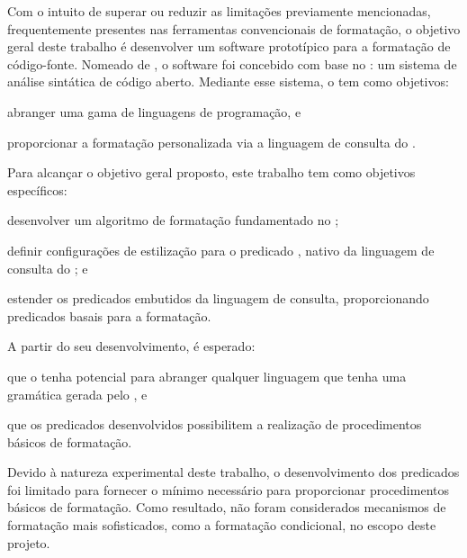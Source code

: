 \documentclass
  [11pt,a4paper,english,brazil,openright,sumario=tradicional,twoside]
  {abntex2}
\begin{document}
  Com o intuito de superar ou reduzir as limitações previamente mencionadas,
  frequentemente presentes nas ferramentas convencionais de formatação, o
  objetivo geral deste trabalho é desenvolver um software prototípico para a
  formatação de código-fonte. Nomeado de \witchcooking \cite{silva-2023-witch},
  o software foi concebido com base no \treesitter
  \cite{tree-sitter-2023-tree}: um sistema de análise sintática de código
  aberto. Mediante esse sistema, o \witchcooking tem como objetivos:
  \begin{inparaenum}
    \item abranger uma gama de linguagens de programação, e
    \item proporcionar a formatação personalizada via a linguagem de consulta
          do \treesitter.
  \end{inparaenum}

  Para alcançar o objetivo geral proposto, este trabalho tem como objetivos
  específicos:
  \begin{inparaenum}
    \item desenvolver um algoritmo de formatação fundamentado no \treesitter;
    \item definir configurações de estilização para o predicado
          , nativo da linguagem de consulta do
          \treesitter; e
    \item estender os predicados embutidos da linguagem de consulta,
          proporcionando predicados basais para a formatação.
  \end{inparaenum}

  A partir do seu desenvolvimento, é esperado:
  \begin{inparaenum}
    \item que o \witchcooking tenha potencial para abranger qualquer linguagem
          que tenha uma gramática gerada pelo \treesitter, e
    \item que os predicados desenvolvidos possibilitem a realização de
          procedimentos básicos de formatação.
  \end{inparaenum}

  Devido à natureza experimental deste trabalho, o desenvolvimento dos
  predicados foi limitado para fornecer o mínimo necessário para proporcionar
  procedimentos básicos de formatação. Como resultado, não foram considerados
  mecanismos de formatação mais sofisticados, como a formatação condicional, no
  escopo deste projeto.

\end{document}
